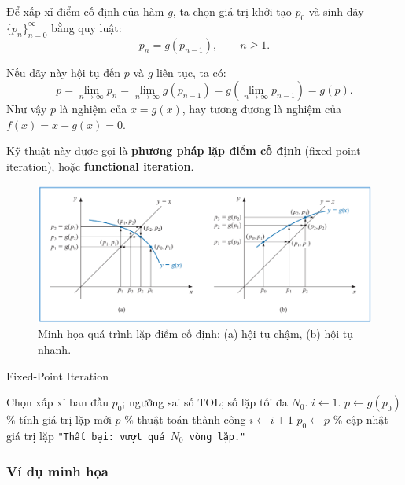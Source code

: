 Để xấp xỉ điểm cố định của hàm $g$, ta chọn giá trị khởi tạo $p_0$ và sinh dãy
$\{p_n\}_{n=0}^{\infty}$ bằng quy luật:
\[
p_n = g(p_{n-1}), \qquad n \ge 1.
\]

Nếu dãy này hội tụ đến $p$ và $g$ liên tục, ta có:
\[
p = \lim_{n\to\infty} p_n = \lim_{n\to\infty} g(p_{n-1})
  = g\!\left(\lim_{n\to\infty} p_{n-1}\right) = g(p).
\]
Như vậy $p$ là nghiệm của $x = g(x)$, hay tương đương là nghiệm của $f(x) = x - g(x) = 0$.

Kỹ thuật này được gọi là \textbf{phương pháp lặp điểm cố định} (fixed-point iteration),
hoặc \textbf{functional iteration}.

\begin{figure}[!h]
\centering
\includegraphics[width=0.8\linewidth]{figures/fixed_point_iteration_placeholder.png}
\caption{Minh họa quá trình lặp điểm cố định: (a) hội tụ chậm, (b) hội tụ nhanh.}
\label{fig:fixed_point_iteration}
\end{figure}

\begin{algorithm}[!h]
\caption{Fixed-Point Iteration}
\label{alg:fixed_point_iteration}
\begin{algorithmic}[1]
\State Chọn xấp xỉ ban đầu $p_0$; ngưỡng sai số $\text{TOL}$; số lặp tối đa $N_0$.
\State $i \gets 1$.
    \State $p \gets g(p_0)$ \hfill \% tính giá trị lặp mới
        \State \Return $p$ \hfill \% thuật toán thành công
    \EndIf
    \State $i \gets i + 1$
    \State $p_0 \gets p$ \hfill \% cập nhật giá trị lặp
\EndWhile
\State \Return \texttt{"Thất bại: vượt quá $N_0$ vòng lặp."}
\end{algorithmic}
\end{algorithm}


\subsubsection*{Ví dụ minh họa}

